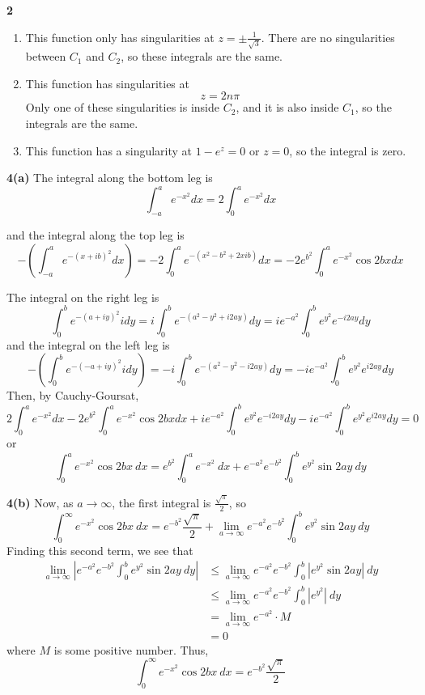 \documentclass{article}
\begin{document}
\textbf{2}
\begin{enumerate}
	\item This function only has singularities at $z = \pm \frac{1}{\sqrt{3}}$. There are no singularities between $C_1$ and $C_2$, so these integrals are the same.
	
	\item This function has singularities at
	\[
		z = 2n \pi
	\]
	Only one of these singularities is inside $C_2$, and it is also inside $C_1$, so the integrals are the same.
	
	\item This function has a singularity at $1 - e^z = 0$ or $z = 0$, so the integral is zero.
\end{enumerate}

\textbf{4(a)}
The integral along the bottom leg is
\[
	\int_{-a}^a e^{-x^2} dx = 2 \int_0^a e^{-x^2} dx
\]

and the integral along the top leg is
\[
	- \left(\int_{-a}^{a} e^{-(x+ib)^2} dx \right)
	= -2 \int_0^a e^{-(x^2 - b^2 + 2xib) } dx
	= -2 e^{b^2} \int_0^a e^{-x^2} \cos 2bx dx
\]

The integral on the right leg is
\[
	\int_0^b e^{-(a + iy)^2} idy 
	= i\int_0^b e^{-(a^2 - y^2 + i2ay) } dy
	= ie^{-a^2} \int_0^b e^{y^2} e^{-i2ay} dy 
\]
and the integral on the left leg is
\[
	-\left( \int_0^b e^{-(-a + iy)^2} i dy \right)
	= -i \int_0^b e^{-(a^2 - y^2 - i 2ay)} dy
	= -i e^{-a^2} \int_0^b e^{y^2} e^{i2ay} dy
\]
Then, by Cauchy-Goursat,
\[	
	2 \int_0^a e^{-x^2} dx
	-2 e^{b^2} \int_0^a e^{-x^2} \cos 2bx dx
	+ ie^{-a^2} \int_0^b e^{y^2} e^{-i2ay} dy
	-i e^{-a^2} \int_0^b e^{y^2} e^{i2ay} dy	= 0
\]
or
\[
	\int_0^a e^{-x^2} \cos 2bx~dx
	= e^{b^2} \int_0^a e^{-x^2}~dx
	+ e^{-a^2} e^{-b^2} \int_0^b e^{y^2} \sin 2ay~dy
\]

\textbf{4(b)}
Now, as $a \to \infty$, the first integral is $\frac{\sqrt{\pi}}{2}$, so
\[
	\int_0^\infty e^{-x^2} \cos 2bx~dx
	= e^{-b^2} \frac{\sqrt{\pi}}{2}
	+ \lim_{a \to \infty} e^{-a^2} e^{-b^2} \int_0^b e^{y^2} \sin 2ay~dy
\]
Finding this second term, we see that
\begin{align*}
	\lim_{a \to \infty} \left| e^{-a^2}e^{-b^2}\int_0^b e^{y^2}\sin 2ay~dy \right|
	&\le \lim_{a \to \infty} e^{-a^2}e^{-b^2}\int_0^b |e^{y^2} \sin 2ay|~dy \\
	&\le \lim_{a \to \infty} e^{-a^2}e^{-b^2}\int_0^b |e^{y^2}|~dy \\
	&= \lim_{a \to \infty} e^{-a^2} \cdot M \\
	&= 0
\end{align*}
where $M$ is some positive number. Thus,
\[
	\int_0^\infty e^{-x^2} \cos 2bx~dx
	= e^{-b^2} \frac{\sqrt{\pi}}{2}
\]
\end{document}
